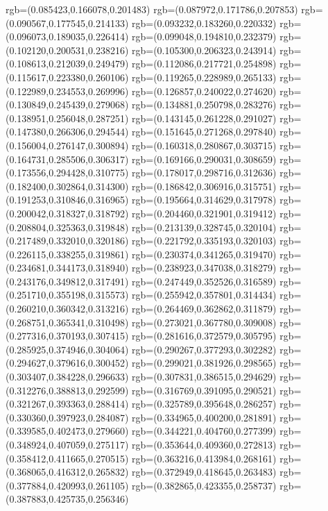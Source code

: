 {{{			rgb=(0.085423,0.166078,0.201483)
			rgb=(0.087972,0.171786,0.207853)
			rgb=(0.090567,0.177545,0.214133)
			rgb=(0.093232,0.183260,0.220332)
			rgb=(0.096073,0.189035,0.226414)
			rgb=(0.099048,0.194810,0.232379)
			rgb=(0.102120,0.200531,0.238216)
			rgb=(0.105300,0.206323,0.243914)
			rgb=(0.108613,0.212039,0.249479)
			rgb=(0.112086,0.217721,0.254898)
			rgb=(0.115617,0.223380,0.260106)
			rgb=(0.119265,0.228989,0.265133)
			rgb=(0.122989,0.234553,0.269996)
			rgb=(0.126857,0.240022,0.274620)
			rgb=(0.130849,0.245439,0.279068)
			rgb=(0.134881,0.250798,0.283276)
			rgb=(0.138951,0.256048,0.287251)
			rgb=(0.143145,0.261228,0.291027)
			rgb=(0.147380,0.266306,0.294544)
			rgb=(0.151645,0.271268,0.297840)
			rgb=(0.156004,0.276147,0.300894)
			rgb=(0.160318,0.280867,0.303715)
			rgb=(0.164731,0.285506,0.306317)
			rgb=(0.169166,0.290031,0.308659)
			rgb=(0.173556,0.294428,0.310775)
			rgb=(0.178017,0.298716,0.312636)
			rgb=(0.182400,0.302864,0.314300)
			rgb=(0.186842,0.306916,0.315751)
			rgb=(0.191253,0.310846,0.316965)
			rgb=(0.195664,0.314629,0.317978)
			rgb=(0.200042,0.318327,0.318792)
			rgb=(0.204460,0.321901,0.319412)
			rgb=(0.208804,0.325363,0.319848)
			rgb=(0.213139,0.328745,0.320104)
			rgb=(0.217489,0.332010,0.320186)
			rgb=(0.221792,0.335193,0.320103)
			rgb=(0.226115,0.338255,0.319861)
			rgb=(0.230374,0.341265,0.319470)
			rgb=(0.234681,0.344173,0.318940)
			rgb=(0.238923,0.347038,0.318279)
			rgb=(0.243176,0.349812,0.317491)
			rgb=(0.247449,0.352526,0.316589)
			rgb=(0.251710,0.355198,0.315573)
			rgb=(0.255942,0.357801,0.314434)
			rgb=(0.260210,0.360342,0.313216)
			rgb=(0.264469,0.362862,0.311879)
			rgb=(0.268751,0.365341,0.310498)
			rgb=(0.273021,0.367780,0.309008)
			rgb=(0.277316,0.370193,0.307415)
			rgb=(0.281616,0.372579,0.305795)
			rgb=(0.285925,0.374946,0.304064)
			rgb=(0.290267,0.377293,0.302282)
			rgb=(0.294627,0.379616,0.300452)
			rgb=(0.299021,0.381926,0.298565)
			rgb=(0.303407,0.384228,0.296633)
			rgb=(0.307831,0.386515,0.294629)
			rgb=(0.312276,0.388813,0.292599)
			rgb=(0.316769,0.391095,0.290521)
			rgb=(0.321267,0.393363,0.288414)
			rgb=(0.325789,0.395648,0.286257)
			rgb=(0.330360,0.397923,0.284087)
			rgb=(0.334965,0.400200,0.281891)
			rgb=(0.339585,0.402473,0.279660)
			rgb=(0.344221,0.404760,0.277399)
			rgb=(0.348924,0.407059,0.275117)
			rgb=(0.353644,0.409360,0.272813)
			rgb=(0.358412,0.411665,0.270515)
			rgb=(0.363216,0.413984,0.268161)
			rgb=(0.368065,0.416312,0.265832)
			rgb=(0.372949,0.418645,0.263483)
			rgb=(0.377884,0.420993,0.261105)
			rgb=(0.382865,0.423355,0.258737)
			rgb=(0.387883,0.425735,0.256346)
}}}
